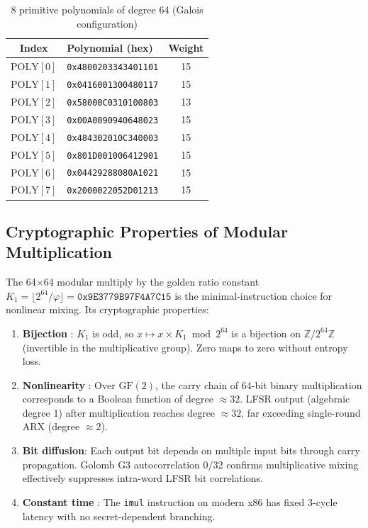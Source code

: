 \documentclass[11pt,a4paper]{article}
\begin{document}
\begin{table}[H]
\centering
\begin{tabular}{@{}clc@{}}
\toprule
\textbf{Index} & \textbf{Polynomial (hex)} & \textbf{Weight} \\
\midrule
$\mathrm{POLY}[0]$ & \texttt{0x4800203343401101} & 15 \\
$\mathrm{POLY}[1]$ & \texttt{0x0416001300480117} & 15 \\
$\mathrm{POLY}[2]$ & \texttt{0x58000C0310100803} & 13 \\
$\mathrm{POLY}[3]$ & \texttt{0x00A0090940648023} & 15 \\
$\mathrm{POLY}[4]$ & \texttt{0x484302010C340003} & 15 \\
$\mathrm{POLY}[5]$ & \texttt{0x801D001006412901} & 15 \\
$\mathrm{POLY}[6]$ & \texttt{0x04429288080A1021} & 15 \\
$\mathrm{POLY}[7]$ & \texttt{0x2000022052D01213} & 15 \\
\bottomrule
\end{tabular}
\caption{8 primitive polynomials of degree 64 (Galois configuration)}
\label{tab:polys}
\end{table}

\subsection{Cryptographic Properties of Modular Multiplication}

The 64$\times$64 modular multiply by the golden ratio constant
$K_1 = \lfloor 2^{64}/\varphi \rfloor = \mathtt{0x9E3779B97F4A7C15}$ is the
minimal-instruction choice for nonlinear mixing. Its cryptographic properties:

\begin{enumerate}
\item \textbf{Bijection} \cite{knuth}: $K_1$ is odd, so $x \mapsto x \times K_1
  \bmod 2^{64}$ is a bijection on $\mathbb{Z}/2^{64}\mathbb{Z}$ (invertible in
  the multiplicative group). Zero maps to zero without entropy loss.
\item \textbf{Nonlinearity} \cite{lidl}: Over $\mathrm{GF}(2)$, the carry chain
  of 64-bit binary multiplication corresponds to a Boolean function of degree
  $\approx 32$. LFSR output (algebraic degree 1) after multiplication reaches
  degree $\approx 32$, far exceeding single-round ARX (degree $\approx 2$).
\item \textbf{Bit diffusion}: Each output bit depends on multiple input bits
  through carry propagation. Golomb G3 autocorrelation 0/32 \cite{golomb}
  confirms multiplicative mixing effectively suppresses intra-word LFSR bit
  correlations.
\item \textbf{Constant time} \cite{chacha}: The \texttt{imul} instruction on
  modern x86 has fixed 3-cycle latency with no secret-dependent branching.
\end{enumerate}
\end{document}
